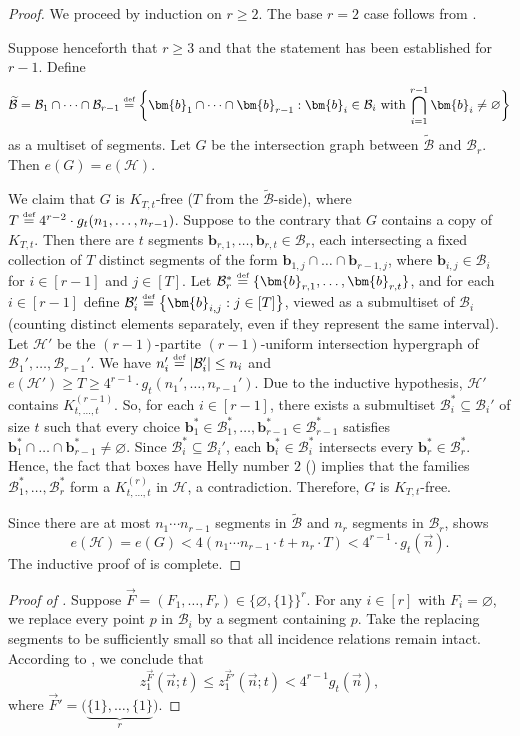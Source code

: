 \documentclass[11pt]{article}
\theoremstyle{definition}
\newcommand*{\eqdef}{\stackrel{\mbox{\normalfont\tiny def}}{=}} %
\newcommand*{\cH}{\mathcal{H}}
\newcommand*{\vF}{\vec{F}}
\newcommand*{\cB}{\mathcal{B}}
\newcommand*{\vn}{\vec{n}}
\begin{document}
\begin{proof}
    We proceed by induction on $r \ge 2$. The base $r = 2$ case follows from . 
    
    Suppose henceforth that $r \ge 3$ and that the statement has been established for $r - 1$. Define
    \[
    \widetilde{\cB} = \cB_1 \cap \dots \cap \cB_{r-1} \eqdef \biggl\{ \bm{b}_1 \cap \dots \cap \bm{b}_{r-1} : \text{$\bm{b}_i \in \cB_i$ with $\bigcap\limits_{i=1}^{r-1} \bm{b}_i \ne \varnothing$} \biggr\}
    \]
    as a multiset of segments. Let $G$ be the intersection graph between $\widetilde{\cB}$ and $\cB_r$. Then $e(G) = e(\cH)$. 

    We claim that $G$ is $K_{T, t}$-free ($T$ from the $\widetilde{\cB}$-side), where $T \eqdef 4^{r-2} \cdot g_t(n_1, \dots, n_{r-1})$. Suppose to the contrary that $G$ contains a copy of $K_{T, t}$. Then there are $t$ segments $\bm{b}_{r, 1}, \dots, \bm{b}_{r, t} \in \cB_r$, each intersecting a fixed collection of $T$ distinct segments of the form $\bm{b}_{1, j} \cap \dots \cap \bm{b}_{r-1, j}$, where $\bm{b}_{i, j} \in \cB_i$ for $i \in [r-1]$ and $j \in [T]$. Let $\cB_r^* \eqdef \{\bm{b}_{r, 1}, \dots, \bm{b}_{r, t}\}$, and for each $i \in [r-1]$ define $\cB_i' \eqdef \bigl\{ \bm{b}_{i, j} : j \in [T] \bigr\}$, viewed as a submultiset of $\cB_i$ (counting distinct elements separately, even if they represent the same interval). Let $\cH'$ be the $(r-1)$-partite $(r-1)$-uniform intersection hypergraph of $\cB_1', \dots, \cB_{r-1}'$. We have $n_i' \eqdef |\cB_i'| \le n_i$ and $e(\cH') \ge T \ge 4^{r-1} \cdot g_t(n_1', \dots, n_{r-1}')$. Due to the inductive hypothesis, $\cH'$ contains $K_{t, \dots, t}^{(r-1)}$. So, for each $i \in [r-1]$, there exists a submultiset $\cB_i^* \subseteq \cB_i'$ of size $t$ such that every choice $\bm{b}_1^* \in \cB_1^*, \dots, \bm{b}_{r-1}^* \in \cB_{r-1}^*$ satisfies $\bm{b}_1^* \cap \dots \cap \bm{b}_{r-1}^* \ne \varnothing$. Since $\cB_i^* \subseteq \cB_i'$, each $\bm{b}_i^* \in \cB_i^*$ intersects every $\bm{b}_r^* \in \cB_r^*$. Hence, the fact that boxes have Helly number $2$ () implies that the families $\cB_1^*,\dots,\cB_r^*$ form a $K_{t,\dots,t}^{(r)}$ in $\cH$, a contradiction. Therefore, $G$ is $K_{T,t}$-free.
    
    Since there are at most $n_1 \cdots n_{r-1}$ segments in $\widetilde{\cB}$ and $n_r$ segments in $\cB_r$,  shows
    \[
    e(\cH) = e(G) < 4(n_1 \cdots n_{r-1} \cdot t + n_r \cdot T) < 4^{r-1} \cdot g_t(\vn). 
    \]
    The inductive proof of  is complete. 
\end{proof}

\begin{proof}[Proof of ]
    Suppose $\vF = (F_1, \dots, F_r) \in \bigl\{ \varnothing, \{1\} \bigr\}^r$. For any $i \in [r]$ with $F_i = \varnothing$, we replace every point $p$ in $\cB_i$ by a segment containing $p$. Take the replacing segments to be sufficiently small so that all incidence relations remain intact. According to , we conclude that
    \[
    z_1^{\vF}(\vn; t) \le z_1^{\vF'}(\vn; t) < 4^{r-1} g_t(\vn),
    \]
    where $\vF'= \bigl( \underbrace{\{1\}, \dots, \{1\}}_{r} \bigr)$.
\end{proof}
\end{document}

